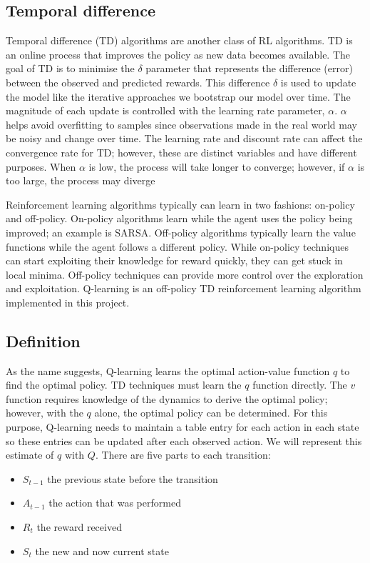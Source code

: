 \documentclass[]{final_report}
\begin{document}
\subsection{Temporal difference}

Temporal difference (TD) algorithms are another class of RL algorithms. TD is an online process that improves the policy as new data becomes available. The goal of TD is to minimise the $\delta$ parameter that represents the difference (error) between the observed and predicted rewards. This difference $\delta$ is used to update the model like the iterative approaches we bootstrap our model over time. The magnitude of each update is controlled with the learning rate parameter, $\alpha$. $\alpha$ helps avoid overfitting to samples since observations made in the real world may be noisy and change over time. The learning rate and discount rate can affect the convergence rate for TD; however, these are distinct variables and have different purposes. When $\alpha$ is low, the process will take longer to converge; however, if $\alpha$ is too large, the process may diverge

Reinforcement learning algorithms typically can learn in two fashions: on-policy and off-policy. On-policy algorithms learn while the agent uses the policy being improved; an example is SARSA. Off-policy algorithms typically learn the value functions while the agent follows a different  policy. While on-policy techniques can start exploiting their knowledge for reward quickly, they can get stuck in local minima. Off-policy techniques can provide more control over the exploration and exploitation. Q-learning is an off-policy TD reinforcement learning algorithm implemented in this project.

\subsection{Definition}

As the name suggests, Q-learning learns the optimal action-value function $q$ to find the optimal policy. TD techniques must learn the $q$ function directly. The $v$ function requires knowledge of the dynamics to derive the optimal policy; however, with the $q$ alone, the optimal policy can be determined. For this purpose, Q-learning needs to maintain a table entry for each action in each state so these entries can be updated after each observed action. We will represent this estimate of $q$ with $Q$. There are five parts to each transition: 
\begin{itemize}
  \item $S_{t-1}$ the previous state before the transition
  \item $A_{t-1}$ the action that was performed
  \item $R_t$ the reward received
  \item $S_t$ the new and now current state
\end{itemize}
\end{document}
